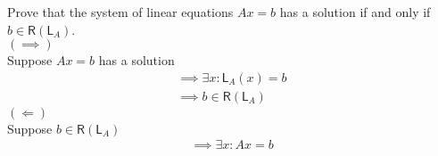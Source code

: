 Prove that the system of linear equations $Ax=b$ has a solution if and
only if $b\in \mathsf{R}(\mathsf{L}_A)$.
\\$(\implies)$
\\Suppose $Ax=b$ has a solution
\begin{gather}
\implies \exists x \colon \mathsf{L}_A(x) =b\\
\implies b \in \mathsf{R}(\mathsf{L}_A)
\end{gather}
$(\Leftarrow)$
\\Suppose $b \in \mathsf{R}(\mathsf{L}_A)$
\begin{gather}
\implies \exists x \colon Ax =b
\end{gather}
